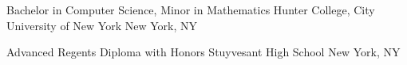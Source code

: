 

\begin{cventries}


  \cventryeduitems
    {Bachelor in Computer Science, Minor in Mathematics} %
    {Hunter College, City University of New York} %
    {New York, NY} %

  \cventryeduitems
    {Advanced Regents Diploma with Honors} %
    {Stuyvesant High School} %
    {New York, NY} %

\end{cventries}
